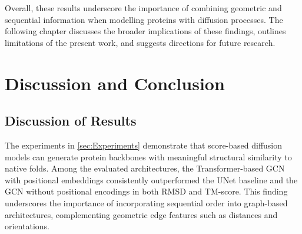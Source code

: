 \documentclass[a4paper,12pt]{article}
\begin{document}
Overall, these results underscore the importance of combining geometric and sequential information when modelling proteins with diffusion processes. The following chapter discusses the broader implications of these findings, outlines limitations of the present work, and suggests directions for future research.

\clearpage

\section{Discussion and Conclusion}\label{sec:Discussion_and_Conclusion}
\subsection{Discussion of Results}\label{subsec:discussion-results}
The experiments in \cref{sec:Experiments} demonstrate that score-based diffusion models can generate protein backbones with meaningful structural similarity to native folds. Among the evaluated architectures, the Transformer-based GCN with positional embeddings consistently outperformed the UNet baseline and the GCN without positional encodings in both RMSD and TM-score. This finding underscores the importance of incorporating sequential order into graph-based architectures, complementing geometric edge features such as distances and orientations.
\end{document}
